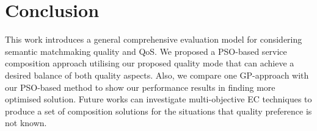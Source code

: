 \documentclass{IEEEtran}
\begin{document}
\section{Conclusion}\label{conclusion}
This work introduces a general comprehensive evaluation model for considering semantic matchmaking quality and QoS. We proposed a PSO-based service composition approach utilising our proposed quality mode that can achieve a desired balance of both quality aspects. Also, we compare one GP-approach with our PSO-based method to show our performance results in finding more optimised solution. Future works can investigate multi-objective EC techniques to produce a set of composition solutions for the situations that quality preference is not known.




\end{document}
